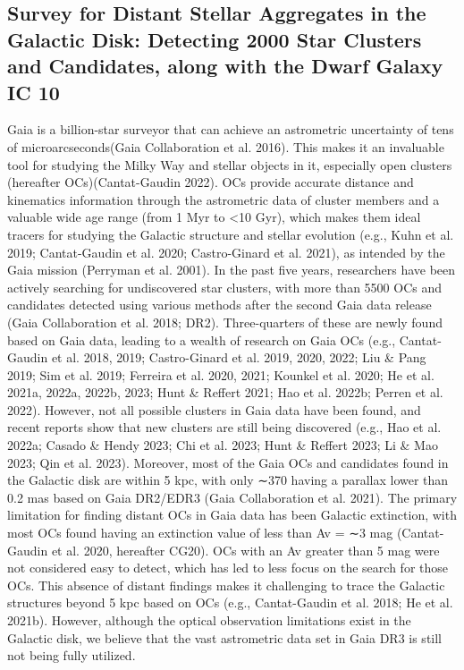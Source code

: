 \documentclass[../Main.tex]{subfiles}
\begin{document}
\subsection{Survey for Distant Stellar Aggregates in the Galactic Disk: Detecting 2000 Star Clusters and Candidates, along with the Dwarf Galaxy IC 10} %
Gaia is a billion-star surveyor that can achieve an astrometric uncertainty of tens of microarcseconds(Gaia Collaboration et al. 2016). This makes it an invaluable tool for studying the Milky Way and stellar objects in it, especially open clusters (hereafter OCs)(Cantat-Gaudin 2022). OCs provide accurate distance and kinematics information through the astrometric data of cluster members and a valuable wide age range (from 1 Myr to <10 Gyr), which makes them ideal tracers for studying the Galactic structure and stellar evolution (e.g., Kuhn et al. 2019; Cantat-Gaudin et al. 2020; Castro-Ginard et al. 2021), as intended by the Gaia mission (Perryman et al. 2001).
In the past five years, researchers have been actively searching for undiscovered star clusters, with more than 5500 OCs and candidates detected using various methods after the second Gaia data release (Gaia Collaboration et al. 2018; DR2). Three-quarters of these are newly found based on Gaia data, leading to a wealth of research on Gaia OCs (e.g., Cantat-Gaudin et al. 2018, 2019; Castro-Ginard et al. 2019, 2020, 2022; Liu \& Pang 2019; Sim et al. 2019; Ferreira et al. 2020, 2021; Kounkel et al. 2020; He et al. 2021a, 2022a, 2022b, 2023; Hunt \& Reffert 2021; Hao et al. 2022b; Perren et al. 2022). However, not all possible clusters in Gaia data have been found, and recent reports show that new clusters are still being discovered (e.g., Hao et al. 2022a;
Casado \& Hendy 2023; Chi et al. 2023; Hunt \& Reffert 2023; Li \& Mao 2023; Qin et al. 2023).
Moreover, most of the Gaia OCs and candidates found in the Galactic disk are within 5 kpc, with only ∼370 having a parallax lower than 0.2 mas based on Gaia DR2/EDR3 (Gaia Collaboration et al. 2021). The primary limitation for finding distant OCs in Gaia data has been Galactic extinction, with most OCs found having an extinction value of less than Av = ∼3 mag (Cantat-Gaudin et al. 2020, hereafter CG20). OCs with an Av greater than 5 mag were not considered easy to detect, which has led to less focus on the search for those OCs. This absence of distant findings makes it challenging to trace the Galactic structures beyond 5 kpc based on OCs (e.g., Cantat-Gaudin et al. 2018; He et al. 2021b). However, although the optical observation limitations exist in the Galactic disk, we believe that the vast astrometric data set in Gaia DR3 is still not being fully utilized.
\end{document}
